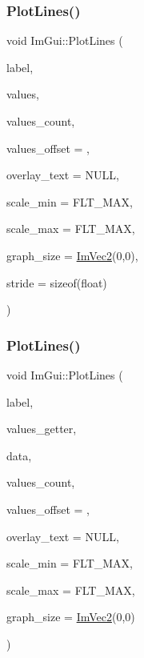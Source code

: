 \hypertarget{namespace_im_gui_a2bc21c56e4796855313804086cca114f}{}\label{namespace_im_gui_a2bc21c56e4796855313804086cca114f} 
\subsubsection{\texorpdfstring{Plot\+Lines()}{PlotLines()}\hspace{0.1cm}{\footnotesize\ttfamily [1/2]}}
{\footnotesize\ttfamily void Im\+Gui\+::\+Plot\+Lines (\begin{DoxyParamCaption}\item[{const char $\ast$}]{label,  }\item[{const float $\ast$}]{values,  }\item[{int}]{values\+\_\+count,  }\item[{int}]{values\+\_\+offset = {},  }\item[{const char $\ast$}]{overlay\+\_\+text = {\ttfamily NULL},  }\item[{float}]{scale\+\_\+min = {\ttfamily FLT\+\_\+MAX},  }\item[{float}]{scale\+\_\+max = {\ttfamily FLT\+\_\+MAX},  }\item[{\hyperlink{struct_im_vec2}{Im\+Vec2}}]{graph\+\_\+size = {\ttfamily \hyperlink{struct_im_vec2}{Im\+Vec2}(0,0)},  }\item[{int}]{stride = {\ttfamily sizeof(float)} }\end{DoxyParamCaption})}

\hypertarget{namespace_im_gui_a94a2645d45c96da35b834dc7db93a9f1}{}\label{namespace_im_gui_a94a2645d45c96da35b834dc7db93a9f1} 
\subsubsection{\texorpdfstring{Plot\+Lines()}{PlotLines()}\hspace{0.1cm}{\footnotesize\ttfamily [2/2]}}
{\footnotesize\ttfamily void Im\+Gui\+::\+Plot\+Lines (\begin{DoxyParamCaption}\item[{const char $\ast$}]{label,  }\item[{float($\ast$)(void $\ast$data, int idx)}]{values\+\_\+getter,  }\item[{void $\ast$}]{data,  }\item[{int}]{values\+\_\+count,  }\item[{int}]{values\+\_\+offset = {},  }\item[{const char $\ast$}]{overlay\+\_\+text = {\ttfamily NULL},  }\item[{float}]{scale\+\_\+min = {\ttfamily FLT\+\_\+MAX},  }\item[{float}]{scale\+\_\+max = {\ttfamily FLT\+\_\+MAX},  }\item[{\hyperlink{struct_im_vec2}{Im\+Vec2}}]{graph\+\_\+size = {\ttfamily \hyperlink{struct_im_vec2}{Im\+Vec2}(0,0)} }\end{DoxyParamCaption})}

